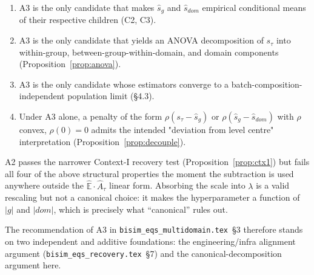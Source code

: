 \documentclass[11pt]{article}
\newcommand{\Ehat}{\widehat{\mathbb{E}}}
\begin{document}
\begin{enumerate}
\item A3 is the only candidate that makes $\widehat s_g$ and
$\widehat s_{dom}$ empirical conditional means of their respective
children (C2, C3).
\item A3 is the only candidate that yields an ANOVA decomposition of
$s_\tau$ into within-group, between-group-within-domain, and domain
components (Proposition~\ref{prop:anova}).
\item A3 is the only candidate whose estimators converge to a
batch-composition-independent population limit (\S4.3).
\item Under A3 alone, a penalty of the form $\rho(s_\tau-\widehat s_g)$ or
$\rho(\widehat s_g-\widehat s_{dom})$ with $\rho$ convex, $\rho(0)=0$
admits the intended "deviation from level centre" interpretation
(Proposition~\ref{prop:decouple}).
\end{enumerate}

A2 passes the narrower Context-I recovery test
(Proposition~\ref{prop:ctx1}) but fails all four of the above
structural properties the moment the subtraction is used anywhere
outside the $\Ehat\cdot\hat A_\tau$ linear form. Absorbing the scale
into $\lambda$ is a valid rescaling but not a canonical choice: it makes
the hyperparameter a function of $|g|$ and $|dom|$, which is precisely
what ``canonical'' rules out.

The recommendation of A3 in \texttt{bisim\_eqs\_multidomain.tex}~\S3
therefore stands on two independent and additive foundations: the
engineering/infra alignment argument
(\texttt{bisim\_eqs\_recovery.tex}~\S7) and the canonical-decomposition
argument here.
\end{document}
